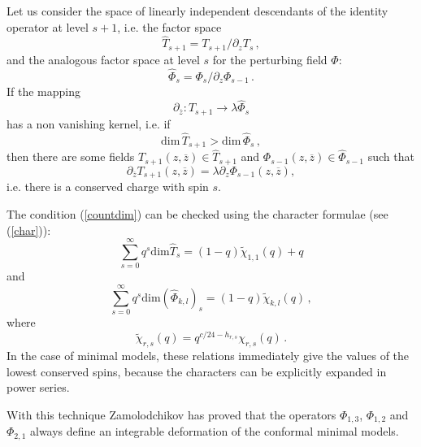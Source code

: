 \documentclass[a4paper,12pt]{report}
\begin{document}
Let us consider the space of linearly independent descendants of the identity operator at level $s+1$, i.e. the
factor space
\begin{equation}
\hat{T}_{s+1}=T_{s+1}/\partial_{z}T_{s}\,,
\end{equation}
and the analogous factor space at level $s$ for the perturbing field $\Phi$:
\begin{equation}
\hat{\Phi}_{s}=\Phi_{s}/\partial_{z}\Phi_{s-1}\,.
\end{equation}
If the mapping
\begin{equation}
\partial_{\overline{z}}:\hat{T}_{s+1}\rightarrow\lambda \hat{\Phi}_{s}
\end{equation}
has a non vanishing kernel, i.e. if
\begin{equation}\label{countdim}
\textrm{dim}\,\hat{T}_{s+1}>\textrm{dim}\, \hat{\Phi}_{s}\,,
\end{equation}
then there are some fields $T_{s+1}\left(z,\overline{z}\right)\in\hat{T}_{s+1}$ and
$\Phi_{s-1}\left(z,\overline{z}\right)\in\hat{\Phi}_{s-1}$ such that
\begin{equation}
\partial_{\overline{z}}T_{s+1}\left(z,\overline{z}\right)=\lambda
\partial_{z}\Phi_{s-1}\left(z,\overline{z}\right),
\end{equation}
i.e. there is a conserved charge with spin $s$.

The condition (\ref{countdim}) can be checked using the character formulae (see (\ref{char})):
\begin{equation}
\sum_{s=0}^{\infty}q^{s}\textrm{dim}\hat{T}_{s}=\left(1-q\right)\tilde{\chi}_{1,1}(q)+q
\end{equation}
and
\begin{equation}
\sum_{s=0}^{\infty}q^{s}\textrm{dim}\left(\hat{\Phi}_{k,l}\right)_{s}=\left(1-q\right)\tilde{\chi}_{k,l}(q)\,,
\end{equation}
where
\begin{equation}
\tilde{\chi}_{r,s}(q)=q^{c/24-h_{r,s}}\chi_{r,s}(q)\,.
\end{equation}
In the case of minimal models, these relations immediately give the values of the lowest conserved spins, because
the characters can be explicitly expanded in power series.

\vspace{0.5cm}

With this technique Zamolodchikov has proved that the operators $\Phi_{1,3}$, $\Phi_{1,2}$ and $\Phi_{2,1}$ always
define an integrable deformation of the conformal minimal models.
\end{document}
